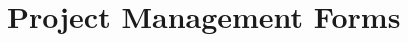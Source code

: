 \documentclass[12pt, a4paper]{report}
\begin{document}





\singlespace



\newpage
\appendix
\appendixpage
\addappheadtotoc

\chapter{Project Management Forms}
\end{document}
